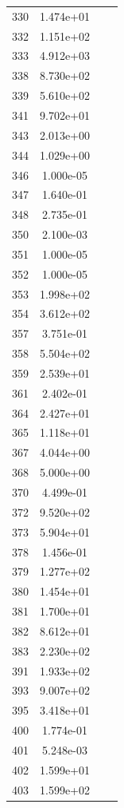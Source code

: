 \documentclass[12pt]{article}
\begin{document}
\begin{longtable}{@{}cccc@{}}
330 & 1.474e+01 &  &  \\
332 & 1.151e+02 &  &  \\
333 & 4.912e+03 &  &  \\
338 & 8.730e+02 &  &  \\
339 & 5.610e+02 &  &  \\
341 & 9.702e+01 &  &  \\
343 & 2.013e+00 &  &  \\
344 & 1.029e+00 &  &  \\
346 & 1.000e-05 &  &  \\
347 & 1.640e-01 &  &  \\
348 & 2.735e-01 &  &  \\
350 & 2.100e-03 &  &  \\
351 & 1.000e-05 &  &  \\
352 & 1.000e-05 &  &  \\
353 & 1.998e+02 &  &  \\
354 & 3.612e+02 &  &  \\
357 & 3.751e-01 &  &  \\
358 & 5.504e+02 &  &  \\
359 & 2.539e+01 &  &  \\
361 & 2.402e-01 &  &  \\
364 & 2.427e+01 &  &  \\
365 & 1.118e+01 &  &  \\
367 & 4.044e+00 &  &  \\
368 & 5.000e+00 &  &  \\
370 & 4.499e-01 &  &  \\
372 & 9.520e+02 &  &  \\
373 & 5.904e+01 &  &  \\
378 & 1.456e-01 &  &  \\
379 & 1.277e+02 &  &  \\
380 & 1.454e+01 &  &  \\
381 & 1.700e+01 &  &  \\
382 & 8.612e+01 &  &  \\
383 & 2.230e+02 &  &  \\
391 & 1.933e+02 &  &  \\
393 & 9.007e+02 &  &  \\
395 & 3.418e+01 &  &  \\
400 & 1.774e-01 &  &  \\
401 & 5.248e-03 &  &  \\
402 & 1.599e+01 &  &  \\
403 & 1.599e+02 &  &  \\

\end{longtable}
\end{document}
